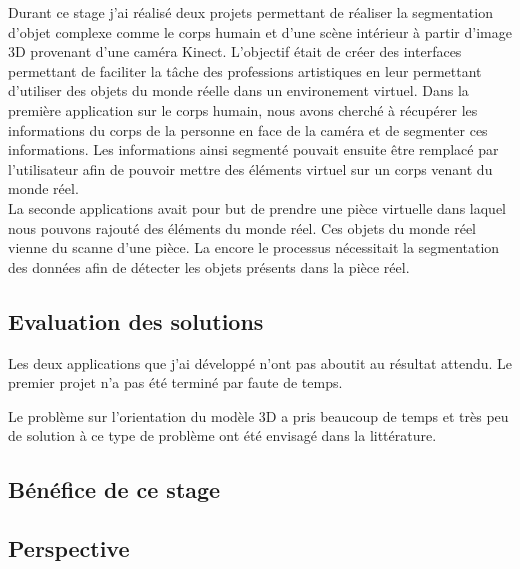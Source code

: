 Durant ce stage j'ai réalisé deux projets permettant de réaliser la segmentation d'objet complexe comme le corps
humain et d'une scène intérieur à partir d'image 3D provenant d'une caméra Kinect. L'objectif était de créer
des interfaces permettant de faciliter la tâche des professions artistiques en leur permettant d'utiliser 
des objets du monde réelle dans un environement virtuel. Dans la première application sur le corps humain,
nous avons cherché à récupérer les informations du corps de la personne en face de la caméra et de segmenter
ces informations. Les informations ainsi segmenté pouvait ensuite être remplacé par l'utilisateur afin de 
pouvoir mettre des éléments virtuel sur un corps venant du monde réel.\\

La seconde applications avait pour but de prendre une pièce virtuelle dans laquel nous pouvons rajouté des éléments 
du monde réel. Ces objets du monde réel vienne du scanne d'une pièce. La encore le processus nécessitait la segmentation 
des données afin de détecter les objets présents dans la pièce réel.

\subsection{Evaluation des solutions}
Les deux applications que j'ai développé n'ont pas aboutit au résultat attendu. Le premier projet n'a pas été terminé
par faute de temps. 


Le problème sur l'orientation du modèle 3D a pris beaucoup de temps et très peu de solution à ce
type de problème ont été envisagé dans la littérature. 
\subsection{Bénéfice de ce stage}
\subsection{Perspective}
